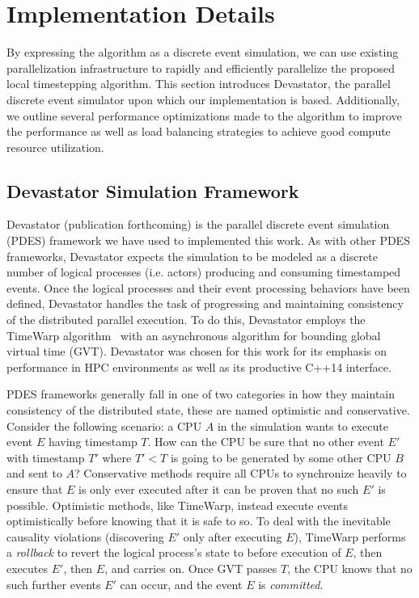 \section{Implementation Details}
\label{sec:implementation}

By expressing the algorithm as a discrete event simulation, we can use existing parallelization infrastructure to rapidly and efficiently parallelize the proposed local timestepping algorithm. This section introduces Devastator, the parallel discrete event simulator upon which our implementation is based. Additionally, we outline several performance optimizations made to the algorithm to improve the performance as well as load balancing strategies to achieve good compute resource utilization.

\subsection{Devastator Simulation Framework}
Devastator (publication forthcoming) is the parallel discrete event simulation (PDES) framework we have used to implemented this work. As with other PDES frameworks, Devastator expects the simulation to be modeled as a discrete number of logical processes (i.e. actors) producing and consuming timestamped events. Once the logical processes and their event processing behaviors have been defined, Devastator handles the task of progressing and maintaining consistency of the distributed parallel execution. To do this, Devastator employs the TimeWarp algorithm~\cite{Jefferson1985} with an asynchronous algorithm for bounding global virtual time (GVT). Devastator was chosen for this work for its emphasis on performance in HPC environments as well as its productive C++14 interface.

PDES frameworks generally fall in one of two categories in how they maintain consistency of the distributed state, these are named optimistic and conservative. Consider the following scenario: a CPU $A$ in the simulation wants to execute event $E$ having timestamp $T$. How can the CPU be sure that no other event $E'$ with timestamp $T'$ where $T' < T$ is going to be generated by some other CPU $B$ and sent to $A$? Conservative methods require all CPUs to synchronize heavily to ensure that $E$ is only ever executed after it can be proven that no such $E'$ is possible. Optimistic methods, like TimeWarp, instead execute events optimistically before knowing that it is safe to so. To deal with the inevitable causality violations (discovering $E'$ only after executing $E$), TimeWarp performs a {\em rollback} to revert the logical process's state to before execution of $E$, then executes $E'$, then $E$, and carries on. Once GVT passes $T$, the CPU knows that no such further events $E'$ can occur, and the event $E$ is {\em committed}.

